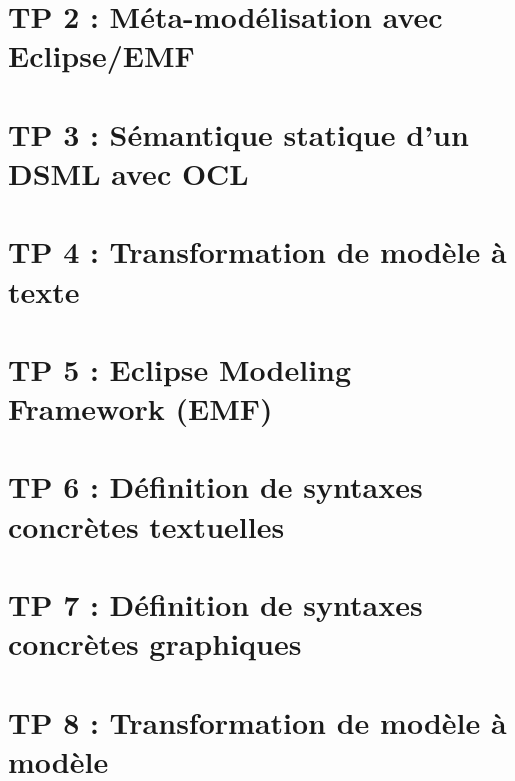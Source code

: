 \documentclass{rapport_gls}
\begin{document}


\newpage

\tableofcontents

\newpage

\chapter{TP 2 : Méta-modélisation avec Eclipse/EMF}

\chapter{TP 3 : Sémantique statique d'un DSML avec OCL}

\chapter{TP 4 : Transformation de modèle à texte}
%
\chapter{TP 5 : Eclipse Modeling Framework (EMF)}
%
\chapter{TP 6 : Définition de syntaxes concrètes textuelles}
%
\chapter{TP 7 : Définition de syntaxes concrètes graphiques}
%
\chapter{TP 8 : Transformation de modèle à modèle}
%
\end{document}
